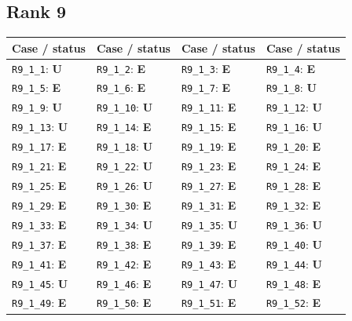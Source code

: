 \subsection*{Rank 9}
\begin{longtable}{llll}
\toprule Case / status & Case / status & Case / status & Case / status \\
\midrule\endhead
\texttt{R9\_1\_1}: \textbf{U} & \texttt{R9\_1\_2}: \textbf{E} & \texttt{R9\_1\_3}: \textbf{E} & \texttt{R9\_1\_4}: \textbf{E} \\
\texttt{R9\_1\_5}: \textbf{E} & \texttt{R9\_1\_6}: \textbf{E} & \texttt{R9\_1\_7}: \textbf{E} & \texttt{R9\_1\_8}: \textbf{U} \\
\texttt{R9\_1\_9}: \textbf{U} & \texttt{R9\_1\_10}: \textbf{U} & \texttt{R9\_1\_11}: \textbf{E} & \texttt{R9\_1\_12}: \textbf{U} \\
\texttt{R9\_1\_13}: \textbf{U} & \texttt{R9\_1\_14}: \textbf{E} & \texttt{R9\_1\_15}: \textbf{E} & \texttt{R9\_1\_16}: \textbf{U} \\
\texttt{R9\_1\_17}: \textbf{E} & \texttt{R9\_1\_18}: \textbf{U} & \texttt{R9\_1\_19}: \textbf{E} & \texttt{R9\_1\_20}: \textbf{E} \\
\texttt{R9\_1\_21}: \textbf{E} & \texttt{R9\_1\_22}: \textbf{U} & \texttt{R9\_1\_23}: \textbf{E} & \texttt{R9\_1\_24}: \textbf{E} \\
\texttt{R9\_1\_25}: \textbf{E} & \texttt{R9\_1\_26}: \textbf{U} & \texttt{R9\_1\_27}: \textbf{E} & \texttt{R9\_1\_28}: \textbf{E} \\
\texttt{R9\_1\_29}: \textbf{E} & \texttt{R9\_1\_30}: \textbf{E} & \texttt{R9\_1\_31}: \textbf{E} & \texttt{R9\_1\_32}: \textbf{E} \\
\texttt{R9\_1\_33}: \textbf{E} & \texttt{R9\_1\_34}: \textbf{U} & \texttt{R9\_1\_35}: \textbf{U} & \texttt{R9\_1\_36}: \textbf{U} \\
\texttt{R9\_1\_37}: \textbf{E} & \texttt{R9\_1\_38}: \textbf{E} & \texttt{R9\_1\_39}: \textbf{E} & \texttt{R9\_1\_40}: \textbf{U} \\
\texttt{R9\_1\_41}: \textbf{E} & \texttt{R9\_1\_42}: \textbf{E} & \texttt{R9\_1\_43}: \textbf{E} & \texttt{R9\_1\_44}: \textbf{U} \\
\texttt{R9\_1\_45}: \textbf{U} & \texttt{R9\_1\_46}: \textbf{E} & \texttt{R9\_1\_47}: \textbf{U} & \texttt{R9\_1\_48}: \textbf{E} \\
\texttt{R9\_1\_49}: \textbf{E} & \texttt{R9\_1\_50}: \textbf{E} & \texttt{R9\_1\_51}: \textbf{E} & \texttt{R9\_1\_52}: \textbf{E} \\

\end{longtable}
